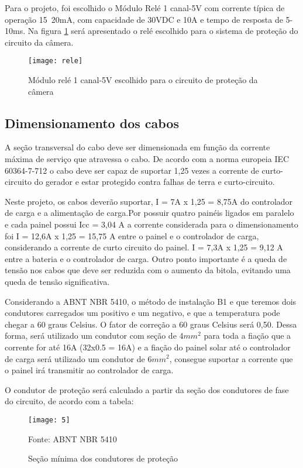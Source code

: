 Para o projeto, foi escolhido o Módulo Relé 1 canal-5V com corrente típica de operação 15~20mA, com capacidade de 30VDC e 10A e tempo de resposta de 5-10ms. Na figura \ref{fig:rele} será apresentado o relé escolhido para o sistema de proteção do circuito da câmera.

\begin{figure}[H]
\centering
\texttt{[image: rele]}
    \caption{Módulo relé 1 canal-5V escolhido para o circuito de proteção da câmera}
\label{fig:rele}
\end{figure}
\FloatBarrier

\subsection{Dimensionamento dos cabos}

A seção transversal do cabo deve ser dimensionada em função da corrente máxima de serviço que atravessa o cabo. De acordo com a norma europeia IEC 60364-7-712 o cabo deve ser capaz de suportar 1,25 vezes a corrente de curto-circuito do gerador e estar protegido contra falhas de terra e curto-circuito. 

Neste projeto, os cabos deverão suportar, I = 7A x 1,25 = 8,75A do controlador de carga e a alimentação de carga.Por possuir quatro painéis ligados em paralelo e cada painel possui Icc = 3,04 A a corrente considerada para o dimensionamento foi I = 12,6A x 1,25 = 15,75 A entre o painel e o  controlador de carga, considerando a corrente de curto circuito do painel. I = 7,3A x 1,25 = 9,12 A entre a bateria e o controlador de carga. Outro ponto importante é a queda de tensão nos cabos que deve ser reduzida com o aumento da bitola, evitando uma queda de tensão significativa.

Considerando a ABNT NBR 5410, o método de instalação B1 e que teremos dois condutores carregados um positivo e um negativo, e que a temperatura pode chegar a 60 graus Celsius. O fator de correção a 60 graus Celsius será 0,50.  Dessa forma, será utilizado um condutor com seção de $4mm^2$ para toda a fiação que a corrente for até 16A (32x0.5 = 16A) e a fiação do painel solar até o controlador de carga será utilizado um condutor de $6mm^2$, consegue suportar a corrente que o painel irá transmitir ao controlador de carga. 

O condutor de proteção será calculado a partir da seção dos condutores de fase do circuito, de acordo com a tabela:

\begin{figure}[H]
\centering
\texttt{[image: 5]}
\caption{Seção mínima dos condutores de proteção}
Fonte: ABNT NBR 5410
\label{fig:5}
\end{figure}

